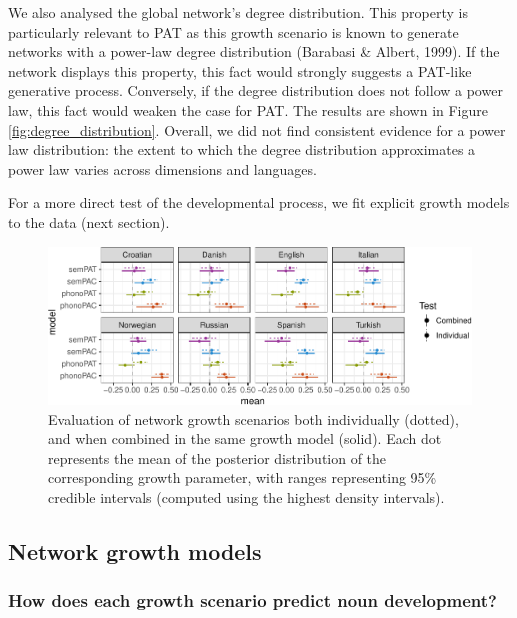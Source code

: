 \documentclass[10pt, letterpaper]{article}
\newenvironment{CodeChunk}{}{}
\begin{document}
We also analysed the global network's degree distribution. This property
is particularly relevant to PAT as this growth scenario is known to
generate networks with a power-law degree distribution (Barabasi \&
Albert, 1999). If the network displays this property, this fact would
strongly suggests a PAT-like generative process. Conversely, if the
degree distribution does not follow a power law, this fact would weaken
the case for PAT. The results are shown in Figure
\ref{fig:degree_distribution}. Overall, we did not find consistent
evidence for a power law distribution: the extent to which the degree
distribution approximates a power law varies across dimensions and
languages.

For a more direct test of the developmental process, we fit explicit
growth models to the data (next section).

\begin{CodeChunk}
\begin{figure}[h]

{\centering \includegraphics{figs/pred_ind_img-1} 

}

\caption{\label{fig:pred_ind}Evaluation of network growth scenarios both individually (dotted), and when combined in the same growth model (solid). Each dot represents the mean of the posterior distribution of the corresponding growth parameter, with ranges representing 95\% credible intervals (computed using the highest density intervals).}\label{fig:pred_ind_img}
\end{figure}
\end{CodeChunk}

\subsection{Network growth models}\label{network-growth-models}

\subsubsection{How does each growth scenario predict noun
development?}\label{how-does-each-growth-scenario-predict-noun-development}
\end{document}
